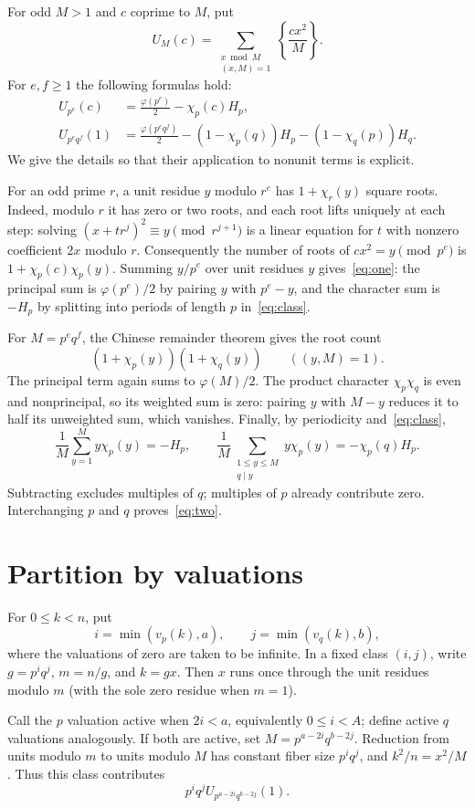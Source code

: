 \documentclass[11pt]{article}
\newcommand{\fr}[1]{\left\{#1\right\}}
\begin{document}
For odd $M>1$ and $c$ coprime to $M$, put
\[
 U_M(c)=\sum_{\substack{x\bmod M\\(x,M)=1}}\fr{\frac{cx^2}{M}}.
\]
For $e,f\ge1$ the following formulas hold:
\begin{align}
 U_{p^e}(c)&=\frac{\varphi(p^e)}2-\chi_p(c)H_p,
 \label{eq:one}\\
 U_{p^e q^f}(1)&=\frac{\varphi(p^e q^f)}2
 -(1-\chi_p(q))H_p-(1-\chi_q(p))H_q.
 \label{eq:two}
\end{align}
We give the details so that their application to nonunit terms is explicit.

For an odd prime $r$, a unit residue $y$ modulo $r^e$ has
$1+\chi_r(y)$ square roots. Indeed, modulo $r$ it has zero or two
roots, and each root lifts uniquely at each step: solving
$(x+t r^j)^2\equiv y\pmod{r^{j+1}}$ is a linear equation for $t$
with nonzero coefficient $2x$ modulo $r$.
Consequently the number of roots of $cx^2=y\pmod{p^e}$ is
$1+\chi_p(c)\chi_p(y)$. Summing $y/p^e$ over unit residues $y$
gives~\eqref{eq:one}: the principal sum is $\varphi(p^e)/2$ by
pairing $y$ with $p^e-y$, and the character sum is $-H_p$ by
splitting into periods of length $p$ in~\eqref{eq:class}.

For $M=p^e q^f$, the Chinese remainder theorem gives the root count
\[
 (1+\chi_p(y))(1+\chi_q(y))
 \qquad ((y,M)=1).
\]
The principal term again sums to $\varphi(M)/2$. The product character
$\chi_p\chi_q$ is even and nonprincipal, so its weighted sum is zero:
pairing $y$ with $M-y$ reduces it to half its unweighted sum, which
vanishes. Finally, by periodicity and~\eqref{eq:class},
\[
 \frac1M\sum_{y=1}^{M}y\chi_p(y)=-H_p,
 \qquad
 \frac1M\sum_{\substack{1\le y\le M\\q\mid y}}y\chi_p(y)
 =-\chi_p(q)H_p.
\]
Subtracting excludes multiples of $q$; multiples of $p$ already contribute
zero. Interchanging $p$ and $q$ proves~\eqref{eq:two}.

\section*{Partition by valuations}
For $0\le k<n$, put
\[
 i=\min(v_p(k),a),\qquad j=\min(v_q(k),b),
\]
where the valuations of zero are taken to be infinite. In a fixed class
$(i,j)$, write $g=p^i q^j$, $m=n/g$, and $k=gx$. Then $x$ runs
once through the unit residues modulo $m$ (with the sole zero residue
when $m=1$).

Call the $p$ valuation active when $2i<a$, equivalently $0\le i<A$;
define active $q$ valuations analogously. If both are active, set
$M=p^{a-2i}q^{b-2j}$. Reduction from units modulo $m$ to units modulo
$M$ has constant fiber size $p^i q^j$, and $k^2/n=x^2/M$.
Thus this class contributes
\begin{equation}\label{eq:both}
 p^i q^j U_{p^{a-2i}q^{b-2j}}(1).
\end{equation}
\end{document}
